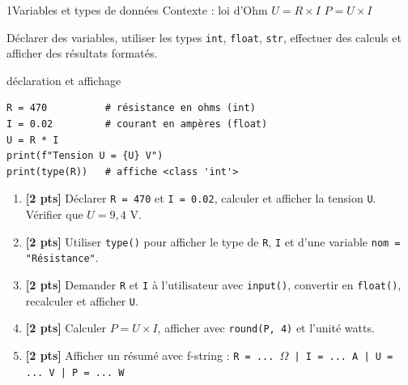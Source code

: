 \documentclass[10pt,a4paper]{article}
\begin{document}
\clearpage
\begin{tptitre}{1}{Variables et types de données}
  Contexte : loi d'Ohm \enspace $U = R \times I$ \enspace $P = U \times I$
\end{tptitre}

\begin{objectifbox}
  Déclarer des variables, utiliser les types \texttt{int}, \texttt{float}, \texttt{str}, effectuer des calculs et afficher des résultats formatés.
\end{objectifbox}

\begin{codebox}{déclaration et affichage}
\begin{lstlisting}
R = 470          # résistance en ohms (int)
I = 0.02         # courant en ampères (float)
U = R * I
print(f"Tension U = {U} V")
print(type(R))   # affiche <class 'int'>
\end{lstlisting}
\end{codebox}

\begin{enumerate}[leftmargin=*, label=\textbf{Q\arabic*.}]
  \item \textbf{[2 pts]} Déclarer \texttt{R = 470} et \texttt{I = 0.02}, calculer et afficher la tension \texttt{U}. Vérifier que $U = 9{,}4$ V.
  \item \textbf{[2 pts]} Utiliser \texttt{type()} pour afficher le type de \texttt{R}, \texttt{I} et d'une variable \texttt{nom = "Résistance"}.
  \item \textbf{[2 pts]} Demander \texttt{R} et \texttt{I} à l'utilisateur avec \texttt{input()}, convertir en \texttt{float()}, recalculer et afficher \texttt{U}.
  \item \textbf{[2 pts]} Calculer $P = U \times I$, afficher avec \texttt{round(P, 4)} et l'unité watts.
  \item \textbf{[2 pts]} Afficher un résumé avec f-string : \texttt{R = ... $\Omega$ | I = ... A | U = ... V | P = ... W}
\end{enumerate}
\end{document}
